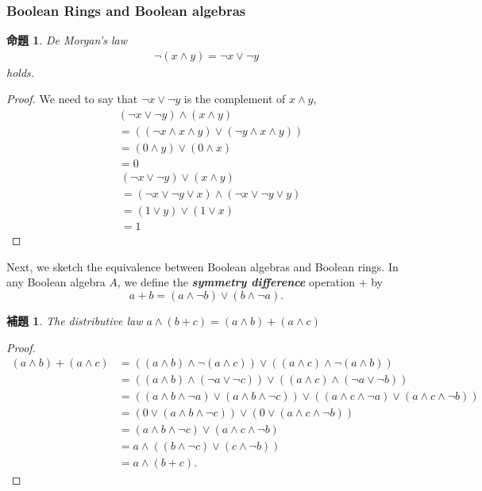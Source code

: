 \documentclass[a4j,12pt]{jarticle}
\numberwithin{equation}{section}
\newcommand{\itbf}[1]{\textit{\textbf{#1}}}
\newtheorem{prop}[thm]{命題}
\newtheorem{lemma}[thm]{補題}
\begin{document}
\subsubsection{Boolean Rings and Boolean algebras}
\begin{prop}
  De Morgan's law
  \begin{align*}
    \neg (x \wedge y) = \neg x \vee \neg y
  \end{align*}
  holds.
\end{prop}
\begin{proof}
  We need to say that $\neg x \vee \neg y$ is the complement of $x \wedge y$,
  \begin{align*}
    & (\neg x \vee \neg y)\wedge (x \wedge y) \\
    &= ((\neg x \wedge x \wedge y) \vee (\neg y \wedge x \wedge y)) \\
    &= (0 \wedge y) \vee (0 \wedge x) \\
    &= 0
  \end{align*}
  \begin{align*}
    & (\neg x \vee \neg y)\vee (x \wedge y) \\
    &= (\neg x \vee \neg y \vee x) \wedge (\neg x \vee \neg y \vee y) \\
    &= (1 \vee y) \vee (1 \vee x) \\
    &= 1
  \end{align*}
\end{proof}
Next, we sketch the equivalence between Boolean algebras and Boolean rings. In any Boolean algebra $A$, we define the \itbf{symmetry difference} operation $+$ by
\begin{equation}
  a + b = (a\wedge \neg b) \vee (b \wedge \neg a).
\end{equation}
\begin{lemma}
  \label{lemma:B-alg-distributivity}
  The distributive law $a \wedge (b+c) = (a\wedge b) + (a \wedge c)$
\end{lemma}
\begin{proof}
  \begin{align*}
    (a \wedge b) + (a \wedge c) &= ((a \wedge b) \wedge \neg (a \wedge c)) \vee ((a \wedge c) \wedge \neg (a \wedge b)) \\
                                &= ((a \wedge b) \wedge (\neg a \vee \neg c)) \vee ((a \wedge c) \wedge (\neg a \vee \neg b)) \\
                                &= ((a \wedge b \wedge \neg a) \vee (a \wedge b \wedge \neg c)) \vee ((a \wedge c \wedge \neg a) \vee (a \wedge c \wedge \neg b)) \\
                                &= (0 \vee (a \wedge b \wedge \neg c)) \vee (0 \vee (a \wedge c \wedge \neg b)) \\
                                &= (a \wedge b \wedge \neg c) \vee (a \wedge c \wedge \neg b) \\
                                &= a \wedge ((b \wedge \neg c) \vee (c \wedge \neg b)) \\
                                &= a \wedge (b + c).
  \end{align*}
\end{proof}
\end{document}
